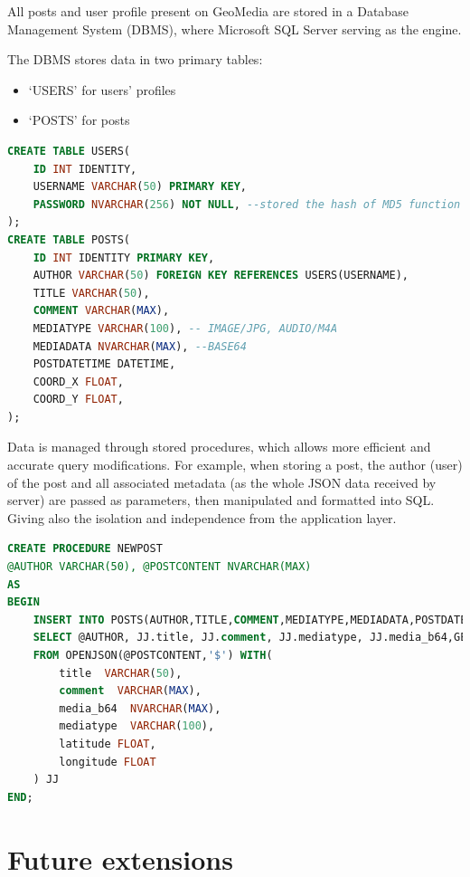 \documentclass[conference]{IEEEtran}
\begin{document}
All posts and user profile present on GeoMedia are stored in a Database Management System (DBMS), where Microsoft SQL Server\cite{b7} serving as the engine.

The DBMS stores data in two primary tables:

\begin{itemize}
    \item `USERS' for users' profiles
    \item `POSTS' for posts 
\end{itemize}

\begin{lstlisting}[language=SQL, caption=Tables creation]
CREATE TABLE USERS(
    ID INT IDENTITY,
    USERNAME VARCHAR(50) PRIMARY KEY,
    PASSWORD NVARCHAR(256) NOT NULL, --stored the hash of MD5 function
);
CREATE TABLE POSTS(
	ID INT IDENTITY PRIMARY KEY,
	AUTHOR VARCHAR(50) FOREIGN KEY REFERENCES USERS(USERNAME),
	TITLE VARCHAR(50),
	COMMENT VARCHAR(MAX),
	MEDIATYPE VARCHAR(100), -- IMAGE/JPG, AUDIO/M4A
	MEDIADATA NVARCHAR(MAX), --BASE64
	POSTDATETIME DATETIME,
	COORD_X FLOAT,
	COORD_Y FLOAT,
);
\end{lstlisting}

Data is managed through stored procedures, which allows more efficient and accurate query modifications. For example, when storing a post,
the author (user) of the post and all associated metadata (as the whole JSON data received by server) are passed as parameters, then manipulated and formatted into SQL. Giving also the isolation and independence from the application layer.

\begin{lstlisting}[language=SQL, caption=Stored Procedure of post creation]
CREATE PROCEDURE NEWPOST
@AUTHOR VARCHAR(50), @POSTCONTENT NVARCHAR(MAX)
AS
BEGIN
	INSERT INTO POSTS(AUTHOR,TITLE,COMMENT,MEDIATYPE,MEDIADATA,POSTDATETIME, LATITUDE, LONGITUDE)
	SELECT @AUTHOR, JJ.title, JJ.comment, JJ.mediatype, JJ.media_b64,GETDATE(), JJ.latitude ,JJ.longitude 
	FROM OPENJSON(@POSTCONTENT,'$') WITH(
		title  VARCHAR(50),
		comment  VARCHAR(MAX),
		media_b64  NVARCHAR(MAX),
		mediatype  VARCHAR(100),
		latitude FLOAT,
		longitude FLOAT
	) JJ
END;

\end{lstlisting}


\section{Future extensions}
\end{document}
